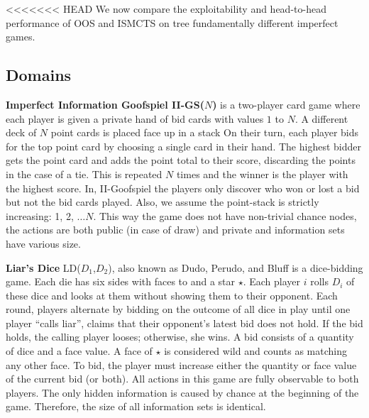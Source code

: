 

<<<<<<< HEAD
We now compare the exploitability  and head-to-head performance
of OOS and ISMCTS on tree fundamentally different imperfect games. %

\subsection{Domains}

\textbf{Imperfect Information Goofspiel II-GS($N$)} is a two-player card game where each player is
given a private hand of bid cards with values $1$ to $N$. A different
deck of $N$ point cards is placed face up in a stack 
On their turn, each player bids for the top point card by 
choosing a single card in their hand. 
The highest bidder gets the point card and adds the point total to their score, discarding
the points in the case of a tie. 
This is repeated $N$ times and the winner is the player with the highest score.
In, II-Goofspiel the players only discover who won or lost a bid but not the bid cards played.
Also, we assume the point-stack is strictly increasing: 1, 2, $\ldots N$.
This way the game does not have non-trivial chance nodes, the actions are both public (in case of draw) and private and information sets have various size.

\textbf{Liar's Dice} LD($D_1$,$D_2$), also known as Dudo, Perudo, and Bluff is a dice-bidding game. 
Each die has six sides with faces  to  and a star $\star$. 
Each player $i$ rolls $D_i$ of these dice and looks at them without showing them to their opponent. 
Each round, players alternate by bidding on the outcome of all dice in play until one player ``calls liar'', 
\ie claims that their opponent's latest bid does not hold.
If the bid holds, the calling player looses; otherwise, she wins.
A bid consists of a quantity of dice and a face value.  
A face of $\star$ is considered wild and counts as matching any other face.
To bid, the player must increase either the quantity or face value of the current 
bid (or both).
All actions in this game are fully observable to both players. The only hidden information is caused by chance at the beginning of the game. Therefore, the size of all information sets is identical. 


